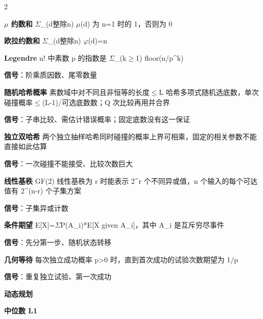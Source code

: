 \documentclass[UTF8,fontset=fandol,a4paper,twoside]{ctexart}
\newcommand{\topic}[1]{\par\smallskip\textbf{#1}\par\nobreak}
\begin{document}
\begin{multicols}{2}
\par\textbf{\ensuremath{\mu} 约数和}\quad
\ensuremath{\Sigma}\_(\allowbreak{}d整除n)\allowbreak{} \ensuremath{\mu}(\allowbreak{}d)\allowbreak{} 为 n=\allowbreak{}1 时的 1，否则为 0\par
\par\textbf{欧拉约数和}\quad
\ensuremath{\Sigma}\_(\allowbreak{}d整除n)\allowbreak{} \ensuremath{\varphi}(\allowbreak{}d)\allowbreak{}=\allowbreak{}n\par
\par\textbf{Legendre}\quad
n! 中素数 p 的指数是 \ensuremath{\Sigma}\_(\allowbreak{}k\ensuremath{\ge}1)\allowbreak{} floor(\allowbreak{}n/\allowbreak{}p\textasciicircum{}k)\allowbreak{}\par
\textbf{信号}：阶乘质因数、尾零数量\par
\par\textbf{随机哈希概率}\quad
素数域中对不同且非恒等的长度\ensuremath{\le}L 哈希多项式随机选底数，单次碰撞概率\ensuremath{\le}(\allowbreak{}L-\allowbreak{}1)\allowbreak{}/\allowbreak{}可选底数数；Q 次比较再用并合界\par
\textbf{信号}：子串比较、需估计错误概率；固定底数没有这一保证\par
\par\textbf{独立双哈希}\quad
两个独立抽样哈希同时碰撞的概率上界可相乘，固定的相关参数不能直接如此估算\par
\textbf{信号}：一次碰撞不能接受、比较次数巨大\par
\par\textbf{线性基秩}\quad
GF(\allowbreak{}2)\allowbreak{} 线性基秩为 r 时能表示 2\textasciicircum{}r 个不同异或值，n 个输入的每个可达值有 2\textasciicircum{}(\allowbreak{}n-\allowbreak{}r)\allowbreak{} 个子集方案\par
\textbf{信号}：子集异或计数\par
\par\textbf{条件期望}\quad
E[\allowbreak{}X]\allowbreak{}=\allowbreak{}\ensuremath{\Sigma}P(\allowbreak{}A\_i)\allowbreak{}*E[\allowbreak{}X given A\_i]\allowbreak{}，其中 A\_i 是互斥穷尽事件\par
\textbf{信号}：先分第一步、随机状态转移\par
\par\textbf{几何等待}\quad
每次独立成功概率 p>\allowbreak{}0 时，直到首次成功的试验次数期望为 1/\allowbreak{}p\par
\textbf{信号}：重复独立试验、第一次成功\par
\topic{动态规划}
\par\textbf{中位数 L1}\quad

\end{multicols}
\end{document}
